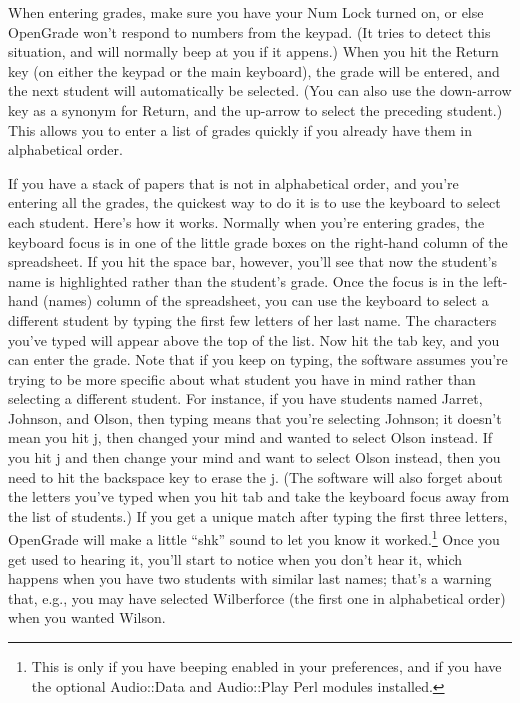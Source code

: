 \documentclass{opengrade_doc}
\begin{document}
When entering grades, make sure you have your Num Lock turned on, or
else OpenGrade won't respond to numbers from the keypad. (It tries to
detect this situation, and will normally beep at you if it appens.)
When you hit
the Return key (on either the keypad or the main keyboard), the grade
will be entered, and the next student will automatically be selected.
(You can also use the down-arrow key as a synonym for Return, and the up-arrow
to select the preceding student.) This allows you to enter a list of
grades quickly if you already have them in alphabetical order.

If you have a stack of papers that is not in alphabetical order, and
you're entering all the grades, the quickest way to do it is to
use the keyboard to select each student. 
Here's how it works. Normally when you're
entering grades, the keyboard focus is in one of the little grade
boxes on the right-hand column of the spreadsheet. If you hit the
space bar, however, you'll see that now the student's name is highlighted
rather than the student's grade. Once the focus is in the left-hand
(names) column of the spreadsheet, you can use the keyboard to select
a different student by typing the first few letters
of her last name. 
The characters you've typed
will appear above the top of the list. Now hit the tab key, and
you can enter the grade. 
Note that if you keep on typing, the software assumes you're trying
to be more specific about what student you have in mind rather than
selecting a different student. For instance, if you have students
named Jarret, Johnson, and Olson, then typing \verb@jo@ means
that you're selecting Johnson; it doesn't mean you hit j, then
changed your mind and wanted to select Olson instead. If you hit
j and then change your mind and want to select Olson instead,
then you need to hit the backspace key to erase the j.
(The software will also forget about the letters you've typed
when you hit tab and take the keyboard focus away from the list
of students.)
If you get a unique match after typing the first three
letters, OpenGrade will make a little ``shk'' sound to let you know it worked.\footnote{This
is only if you have beeping enabled in your preferences, and
if you have the optional Audio::Data and Audio::Play Perl modules
installed.}
Once you get used to hearing it, you'll start to notice when you
don't hear it, which happens when you have two students with similar
last names; that's a warning that, e.g., you may have selected
Wilberforce (the first one in alphabetical order) when you wanted
Wilson.
\end{document}
